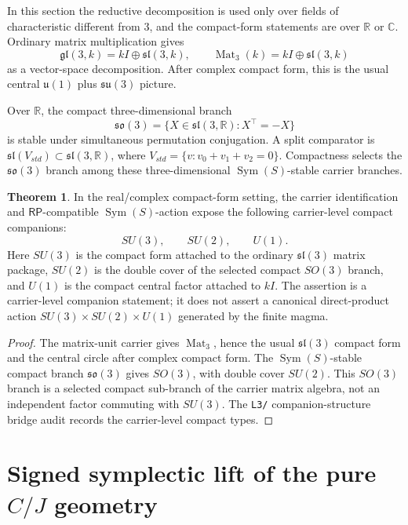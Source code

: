 \documentclass[11pt]{article}
\theoremstyle{definition}
\newtheorem{theorem}{Theorem}[section]
\newcommand{\RP}{\mathsf{RP}}
\begin{document}
In this section the reductive decomposition is used only over fields of
characteristic different from \(3\), and the compact-form statements are over
\(\mathbb R\) or \(\mathbb C\).  Ordinary matrix multiplication gives
\[
\mathfrak{gl}(3,k)=kI\oplus\mathfrak{sl}(3,k),
\qquad
\operatorname{Mat}_3(k)=kI\oplus\mathfrak{sl}(3,k)
\]
as a vector-space decomposition.  After complex compact form, this is the
usual central \(\mathfrak u(1)\) plus \(\mathfrak{su}(3)\) picture.

Over \(\mathbb R\), the compact three-dimensional branch
\[
\mathfrak{so}(3)=\{X\in\mathfrak{sl}(3,\mathbb R):X^\top=-X\}
\]
is stable under simultaneous permutation conjugation.  A split comparator is
\(\mathfrak{sl}(V_{std})\subset\mathfrak{sl}(3,\mathbb R)\), where
\(V_{std}=\{v:v_0+v_1+v_2=0\}\).  Compactness selects the
\(\mathfrak{so}(3)\) branch among these three-dimensional
\(\operatorname{Sym}(S)\)-stable carrier branches.

\begin{theorem}
\label{thm:19.1}
In the real/complex compact-form setting, the carrier identification and
\(\RP\)-compatible \(\operatorname{Sym}(S)\)-action expose the following
carrier-level compact companions:
\[
SU(3),
\qquad
SU(2),
\qquad
U(1).
\]
Here \(SU(3)\) is the compact form attached to the ordinary
\(\mathfrak{sl}(3)\) matrix package, \(SU(2)\) is the double cover of the
selected compact \(SO(3)\) branch, and \(U(1)\) is the compact central
factor attached to \(kI\).  The assertion is a carrier-level companion
statement; it does not assert a canonical direct-product action
\(SU(3)\times SU(2)\times U(1)\) generated by the finite magma.
\end{theorem}

\begin{proof}
The matrix-unit carrier gives \(\operatorname{Mat}_3\), hence the usual
\(\mathfrak{sl}(3)\) compact form and the central circle after complex
compact form.  The \(\operatorname{Sym}(S)\)-stable compact branch
\(\mathfrak{so}(3)\) gives \(SO(3)\), with double cover \(SU(2)\).  This
\(SO(3)\) branch is a selected compact sub-branch of the carrier matrix
algebra, not an independent factor commuting with \(SU(3)\).  The \texttt{L3/} companion-structure bridge audit records the
carrier-level compact types.
\end{proof}

\section{\texorpdfstring{Signed symplectic lift of the pure \(C/J\) geometry}{Signed symplectic lift of the pure C/J geometry}}\label{signed-symplectic-bridge}
\end{document}
